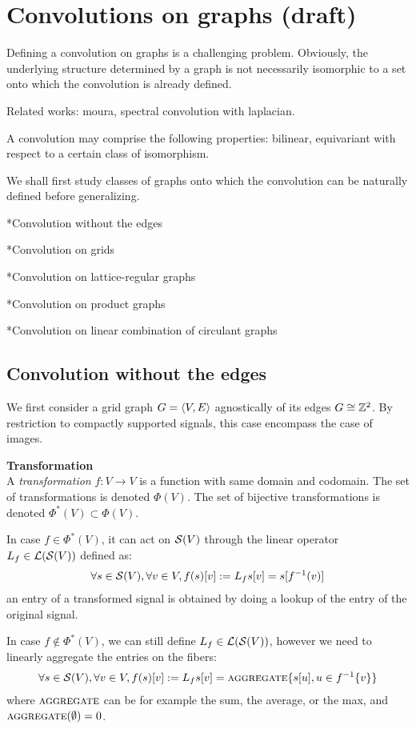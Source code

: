 \section{Convolutions on graphs (draft)}

Defining a convolution on graphs is a challenging problem. Obviously, the underlying structure determined by a graph is not necessarily isomorphic to a set onto which the convolution is already defined. 

Related works: moura, spectral convolution with laplacian.

A convolution may comprise the following properties: bilinear, equivariant with respect to a certain class of isomorphism.

We shall first study classes of graphs onto which the convolution can be naturally defined before generalizing.

*Convolution without the edges

*Convolution on grids

*Convolution on lattice-regular graphs

*Convolution on product graphs

*Convolution on linear combination of circulant graphs

\subsection{Convolution without the edges}

We first consider a grid graph $G = \langle V, E \rangle$ agnostically of its edges \ie $G \cong \mathbb{Z}^2$. By restriction to compactly supported signals, this case encompass the case of images.

\begin{definition}\textbf{Transformation}\\
A \emph{transformation} $f: V \rightarrow V$ is a function with same domain and codomain. The set of transformations is denoted $\Phi(V)$. The set of bijective transformations is denoted $\Phi^*(V) \subset \Phi(V)$.

In case $f \in \Phi^*(V)$, it can act on $\mathcal{S}(V)$ through the linear operator $L_f \in \mathcal{L}(\mathcal{S}(V))$ defined as:
\begin{gather*}
\forall s \in \mathcal{S}(V), \forall v \in V, f(s)[v] := L_f s[v] = s[f^{-1}(v)]
\end{gather*}
\ie an entry of a transformed signal is obtained by doing a lookup of the entry of the original signal.

In case $f \notin \Phi^*(V)$, we can still define $L_f \in \mathcal{L}(\mathcal{S}(V))$, however we need to linearly aggregate the entries on the fibers:
\begin{gather*}
\forall s \in \mathcal{S}(V), \forall v \in V, f(s)[v] := L_f s[v] = \operatorname{\textsc{aggregate}}\{s[u], u \in f^{-1}\{v\}\}
\end{gather*}
where $\operatorname{\textsc{aggregate}}$ can be for example the sum, the average, or the max, and $\operatorname{\textsc{aggregate}}(\emptyset) = 0$.
\end{definition}

